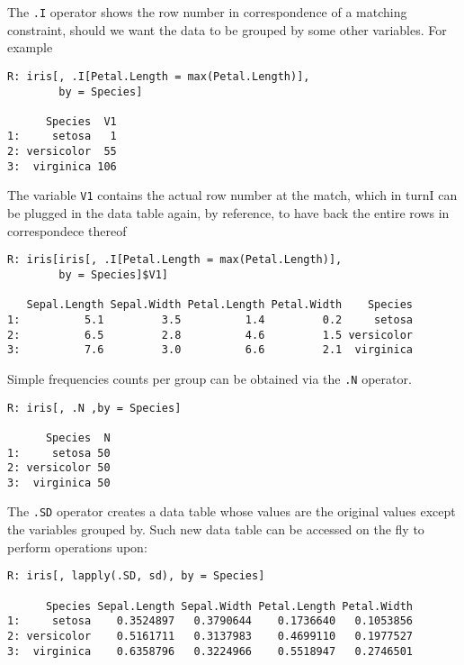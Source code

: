 The \texttt{.I} operator shows the row number in 
correspondence of a matching constraint, should we 
want the data to be grouped by some other variables.
For example
\begin{verbatim}
R: iris[, .I[Petal.Length = max(Petal.Length)], 
		by = Species]

      Species  V1
1:     setosa   1
2: versicolor  55
3:  virginica 106
\end{verbatim}
The variable \texttt{V1} contains the actual row number 
at the match, which in turnI can be plugged in the data 
table again, by reference, to have back the entire rows 
in correspondece thereof 
\begin{verbatim}
R: iris[iris[, .I[Petal.Length = max(Petal.Length)], 
		by = Species]$V1]

   Sepal.Length Sepal.Width Petal.Length Petal.Width    Species
1:          5.1         3.5          1.4         0.2     setosa
2:          6.5         2.8          4.6         1.5 versicolor
3:          7.6         3.0          6.6         2.1  virginica
\end{verbatim}

Simple frequencies counts per group can be obtained 
via the \texttt{.N} operator.
\begin{verbatim}
R: iris[, .N ,by = Species]

      Species  N
1:     setosa 50
2: versicolor 50
3:  virginica 50
\end{verbatim}
The \texttt{.SD} operator creates a data table whose 
values are the original values except the variables 
grouped by. Such new data table can be accessed on the 
fly to perform operations upon:
\begin{verbatim}
R: iris[, lapply(.SD, sd), by = Species]

      Species Sepal.Length Sepal.Width Petal.Length Petal.Width
1:     setosa    0.3524897   0.3790644    0.1736640   0.1053856
2: versicolor    0.5161711   0.3137983    0.4699110   0.1977527
3:  virginica    0.6358796   0.3224966    0.5518947   0.2746501
\end{verbatim}
\bigskip 


